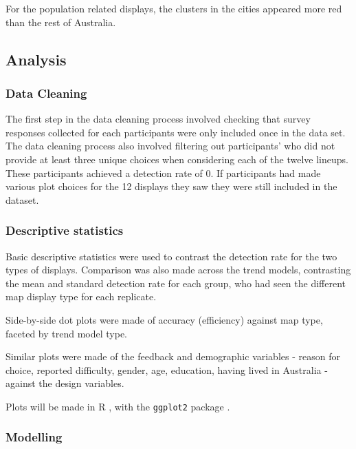 \documentclass{monashthesis}
\begin{document}
For the population related displays, the clusters in the cities appeared more red than the rest of Australia.

\hypertarget{analysis}{%
\subsection{Analysis}\label{analysis}}

\hypertarget{data-cleaning}{%
\subsubsection{Data Cleaning}\label{data-cleaning}}

The first step in the data cleaning process involved checking that survey responses collected for each participants were only included once in the data set.
The data cleaning process also involved filtering out participants' who did not provide at least three unique choices when considering each of the twelve lineups. These participants achieved a detection rate of 0. If participants had made various plot choices for the 12 displays they saw they were still included in the dataset.

\hypertarget{descriptive-statistics}{%
\subsubsection{Descriptive statistics}\label{descriptive-statistics}}

Basic descriptive statistics were used to contrast the detection rate for the two types of displays. Comparison was also made across the trend models, contrasting the mean and standard detection rate for each group, who had seen the different map display type for each replicate.

Side-by-side dot plots were made of accuracy (efficiency) against map type, faceted by trend model type.

Similar plots were made of the feedback and demographic variables - reason for choice, reported difficulty, gender, age, education, having lived in Australia - against the design variables.

Plots will be made in R \autocite{R}, with the \texttt{ggplot2} package \autocite{ggplot2}.

\hypertarget{modelling}{%
\subsubsection{Modelling}\label{modelling}}
\end{document}
